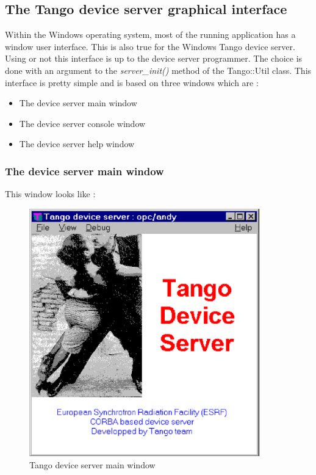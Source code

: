 \subsection{The Tango device server graphical interface}

Within the Windows operating system, most of the running application
has a window user interface. This is also true for the Windows Tango
device server. Using or not this interface is up to the device server
programmer. The choice is done with an argument to the \emph{server\_init()}
method of the Tango::Util class. This interface is pretty
simple and is based on three windows which are :
\begin{itemize}
\item The device server main window
\item The device server console window
\item The device server help window
\end{itemize}

\subsubsection{The device server main window}

This window looks like :

\vspace{0.3cm}


\begin{center}
\begin{figure}
\protect\caption{Tango device server main window}


\includegraphics[width=10cm]{ds_writing/nt_server/main}
\end{figure}

\par\end{center}

